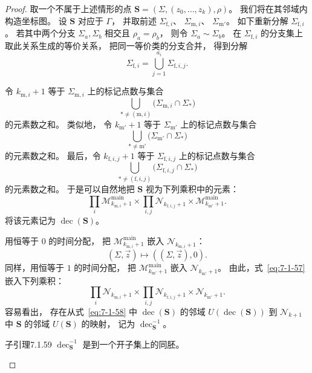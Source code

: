 \begin{proof}
取一个不属于上述情形的点
$\mathbf S
=(\Sigma,(z_0,\ldots,z_k),\rho)$。
我们将在其邻域内构造坐标图。
设 $\mathbf S$ 对应于 $\Gamma$，
并取前述
$\Sigma_{\mathrm f,i}$、
$\Sigma_{\mathrm m,i}$、
$\Sigma_{\mathrm m'}$。
如下重新分解
$\Sigma_{\mathrm f,i}$。
若其中两个分支
$\Sigma_a,\Sigma_b$
相交且
$\rho_a=\rho_b$，
则令
$\Sigma_a\sim\Sigma_b$。
在
$\Sigma_{\mathrm f,i}$
的分支集上取此关系生成的等价关系，
把同一等价类的分支合并，
得到分解
\[
\Sigma_{\mathrm f,i}
=\bigcup_{j=1}^{a_i}
\Sigma_{\mathrm f,i,j}.
\]

令
$k_{\mathrm m,i}+1$
等于
$\Sigma_{\mathrm m,i}$
上的标记点数与集合
\[
\bigcup_{*\ne(\mathrm m,i)}
\bigl(
\Sigma_{\mathrm m,i}\cap\Sigma_*
\bigr)
\]
的元素数之和。
类似地，
令
$k_{\mathrm m'}+1$
等于
$\Sigma_{\mathrm m'}$
上的标记点数与集合
\[
\bigcup_{*\ne\mathrm m'}
\bigl(
\Sigma_{\mathrm m'}\cap\Sigma_*
\bigr)
\]
的元素数之和。
最后，令
$k_{\mathrm f,i,j}+1$
等于
$\Sigma_{\mathrm f,i,j}$
上的标记点数与集合
\[
\bigcup_{*\ne(\mathrm f,i,j)}
\bigl(
\Sigma_{\mathrm f,i,j}\cap\Sigma_*
\bigr)
\]
的元素数之和。
于是可以自然地把
$\mathbf S$
视为下列乘积中的元素：
\begin{equation}
\prod_i
\mathcal M^{\mathrm{main}}_{k_{\mathrm m,i}+1}
\times
\prod_{i,j}
\mathcal N_{k_{\mathrm f,i,j}+1}
\times
\mathcal M^{\mathrm{main}}_{k_{\mathrm m'}+1}.
\tag{7.1.57}\label{eq:7-1-57}
\end{equation}
将该元素记为
$\operatorname{dec}(\mathbf S)$。

用恒等于 $0$ 的时间分配，
把
$\mathcal M^{\mathrm{main}}_{k_{\mathrm m,i}+1}$
嵌入
$\mathcal N_{k_{\mathrm m,i}+1}$：
\[
(\Sigma,\vec z)\longmapsto
((\Sigma,\vec z),0).
\]
同样，用恒等于 $1$ 的时间分配，
把
$\mathcal M^{\mathrm{main}}_{k_{\mathrm m'}+1}$
嵌入
$\mathcal N_{k_{\mathrm m'}+1}$。
由此，式~\eqref{eq:7-1-57}
嵌入下列乘积：
\begin{equation}
\prod_i
\mathcal N_{k_{\mathrm m,i}+1}
\times
\prod_{i,j}
\mathcal N_{k_{\mathrm f,i,j}+1}
\times
\mathcal N_{k_{\mathrm m'}+1}.
\tag{7.1.58}\label{eq:7-1-58}
\end{equation}
容易看出，
存在从式~\eqref{eq:7-1-58}
中 $\operatorname{dec}(\mathbf S)$
的邻域
$U(\operatorname{dec}(\mathbf S))$
到
$\mathcal N_{k+1}$
中 $\mathbf S$ 的邻域
$U(\mathbf S)$
的映射，
记为
$\operatorname{dec}_{\mathbf S}^{-1}$。

\begin{statement}{子引理}{7.1.59}\label{sublem:7-1-59}
$\operatorname{dec}_{\mathbf S}^{-1}$
是到一个开子集上的同胚。
\end{statement}


\end{proof}
